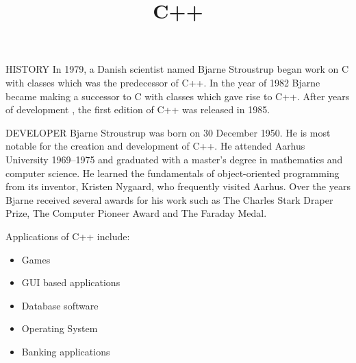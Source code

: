 \documentclass{article}
\title{C++}
\begin{document}
	\maketitle 
	HISTORY
	In 1979, a Danish scientist named  Bjarne Stroustrup began work on C with classes which was the predecessor of C++. In the year of 1982 Bjarne became making a successor to C with classes which gave rise to C++. After years of development , the first edition of C++ was released in 1985.
	
	DEVELOPER
	Bjarne Stroustrup was born on 30 December 1950. He is most notable for the creation and development of C++. He attended Aarhus University 1969–1975 and graduated with a master's degree in mathematics and computer science. He learned the fundamentals of object-oriented programming from its inventor, Kristen Nygaard, who frequently visited Aarhus.
	Over the years Bjarne received several awards for his work such as The Charles Stark Draper Prize, The Computer Pioneer Award and The Faraday Medal.
	
    Applications of C++ include:
    \begin{itemize}
    	\item Games
    	\item GUI based applications
    	\item Database software
    	\item Operating System
    	\item Banking applications
    \end{itemize}
	
	
	
\end{document}
